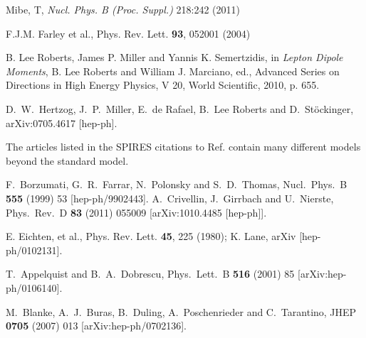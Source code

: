 \begin{thebibliography}{99}
Mibe, T, \textit{Nucl. Phys. B (Proc. Suppl.)}
218:242 (2011)






  F.J.M. Farley et al.,
Phys. Rev. Lett. {\bf 93}, 052001 (2004)

 B. Lee Roberts, James P. Miller and Yannis
  K. Semertzidis, in {\it Lepton Dipole Moments}, B. Lee Roberts and William
  J. Marciano, ed., Advanced Series on Directions in High Energy Physics, V
  20, World Scientific, 2010, p. 655.






 D.~W.~Hertzog, J.~P.~Miller, E.~de Rafael, B.~Lee
Roberts and D.~St\"ockinger,
arXiv:0705.4617 [hep-ph]. %


  The articles listed in the
SPIRES citations to  Ref. \cite{Brown:2001mg} contain many different
models beyond the standard model.

  F.~Borzumati, G.~R.~Farrar, N.~Polonsky and S.~D.~Thomas,
  Nucl.\ Phys.\ B {\bf 555} (1999) 53
  [hep-ph/9902443].
  A.~Crivellin, J.~Girrbach and U.~Nierste,
  Phys.\ Rev.\ D {\bf 83} (2011) 055009
  [arXiv:1010.4485 [hep-ph]].

 E. Eichten, et al., Phys. Rev. Lett. {\bf 45}, 225 (1980);
K. Lane, arXiv [hep-ph/0102131].

 T.~Appelquist and B.~A.~Dobrescu, 
Phys.\ Lett.\ B
\textbf{516}
(2001) 85 [arXiv:hep-ph/0106140]. %

  M.~Blanke, A.~J.~Buras, B.~Duling, A.~Poschenrieder and C.~Tarantino,
  JHEP {\bf 0705} (2007) 013
  [arXiv:hep-ph/0702136].



\end{thebibliography}
